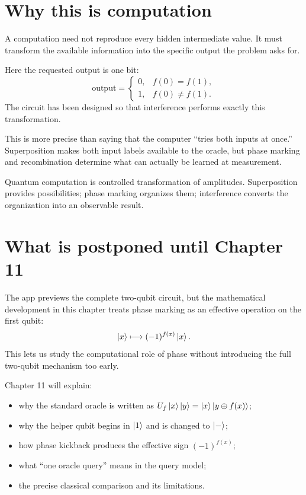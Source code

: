 \section{Why this is computation}
\label{sec:ch07-why-computation}

A computation need not reproduce every hidden intermediate value. It must transform the available information into the specific output the problem asks for.

Here the requested output is one bit:
\begin{equation}
\text{output}=
\begin{cases}
0, & f(0)=f(1),\\
1, & f(0)\ne f(1).
\end{cases}
\end{equation}
The circuit has been designed so that interference performs exactly this transformation.

This is more precise than saying that the computer ``tries both inputs at once.'' Superposition makes both input labels available to the oracle, but phase marking and recombination determine what can actually be learned at measurement.

\begin{coreidea}
Quantum computation is controlled transformation of amplitudes. Superposition provides possibilities; phase marking organizes them; interference converts the organization into an observable result.
\end{coreidea}

\section{What is postponed until Chapter 11}
\label{sec:ch07-postponed}

The app previews the complete two-qubit circuit, but the mathematical development in this chapter treats phase marking as an effective operation on the first qubit:
\begin{equation}
\ket{x}\longmapsto (-1)^{f(x)}\ket{x}.
\label{eq:ch07-effective-phase-oracle}
\end{equation}
This lets us study the computational role of phase without introducing the full two-qubit mechanism too early.

Chapter 11 will explain:
\begin{itemize}
  \item why the standard oracle is written as $U_f\ket{x}\ket{y}=\ket{x}\ket{y\oplus f(x)}$;
  \item why the helper qubit begins in $\ket{1}$ and is changed to $\ket{-}$;
  \item how phase kickback produces the effective sign $(-1)^{f(x)}$;
  \item what ``one oracle query'' means in the query model;
  \item the precise classical comparison and its limitations.
\end{itemize}

